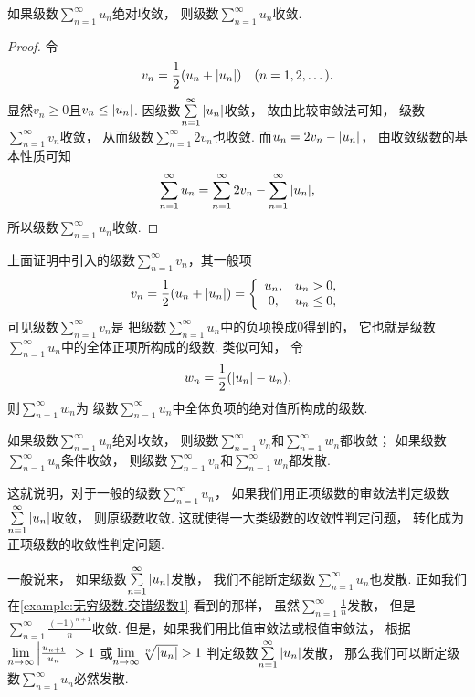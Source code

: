 \begin{theorem}\label{theorem:无穷级数.绝对收敛级数必定收敛}
如果级数\(\sum\limits_{n=1}^\infty u_n\)绝对收敛，
则级数\(\sum\limits_{n=1}^\infty u_n\)收敛.
\begin{proof}
令\[
	v_n = \frac{1}{2} (u_n + \abs{u_n})
	\quad(n=1,2,\dotsc).
\]
显然\(v_n \geq 0\)且\(v_n \leq \abs{u_n}\).
因级数\(\sum\limits_{n=1}^\infty \abs{u_n}\)收敛，
故由比较审敛法可知，
级数\(\sum\limits_{n=1}^\infty v_n\)收敛，
从而级数\(\sum\limits_{n=1}^\infty 2v_n\)也收敛.
而\(u_n = 2 v_n - \abs{u_n}\)，
由收敛级数的基本性质可知\[
	\sum\limits_{n=1}^\infty u_n
	= \sum\limits_{n=1}^\infty 2v_n
	- \sum\limits_{n=1}^\infty \abs{u_n},
\]
所以级数\(\sum\limits_{n=1}^\infty u_n\)收敛.
\end{proof}
\end{theorem}

上面证明中引入的级数\(\sum\limits_{n=1}^\infty v_n\)，其一般项\[
	v_n = \frac{1}{2} (u_n + \abs{u_n})
	= \left\{ \begin{array}{cl}
		u_n, & u_n > 0, \\
		0, & u_n \leq 0,
	\end{array} \right.
\]
可见级数\(\sum\limits_{n=1}^\infty v_n\)是
把级数\(\sum\limits_{n=1}^\infty u_n\)中的负项换成\(0\)得到的，
它也就是级数\(\sum\limits_{n=1}^\infty u_n\)中的全体正项所构成的级数.
类似可知，
令\[
	w_n = \frac{1}{2} (\abs{u_n} - u_n),
\]
则\(\sum\limits_{n=1}^\infty w_n\)为
级数\(\sum\limits_{n=1}^\infty u_n\)中全体负项的绝对值所构成的级数.

如果级数\(\sum\limits_{n=1}^\infty u_n\)绝对收敛，
则级数\(\sum\limits_{n=1}^\infty v_n\)和\(\sum\limits_{n=1}^\infty w_n\)都收敛；
如果级数\(\sum\limits_{n=1}^\infty u_n\)条件收敛，
则级数\(\sum\limits_{n=1}^\infty v_n\)和\(\sum\limits_{n=1}^\infty w_n\)都发散.

这就说明，对于一般的级数\(\sum\limits_{n=1}^\infty u_n\)，
如果我们用正项级数的审敛法判定级数
\(\sum\limits_{n=1}^\infty \abs{u_n}\)收敛，
则原级数收敛.
这就使得一大类级数的收敛性判定问题，
转化成为正项级数的收敛性判定问题.

一般说来，
如果级数\(\sum\limits_{n=1}^\infty \abs{u_n}\)发散，
我们不能断定级数\(\sum\limits_{n=1}^\infty u_n\)也发散.
正如我们在\cref{example:无穷级数.交错级数1} 看到的那样，
虽然\(\sum\limits_{n=1}^\infty \frac{1}{n}\)发散，
但是\(\sum\limits_{n=1}^\infty \frac{(-1)^{n+1}}{n}\)收敛.
但是，如果我们用比值审敛法或根值审敛法，
根据\(\lim\limits_{n\to\infty} \abs{\frac{u_{n+1}}{u_n}} > 1\)
或\(\lim\limits_{n\to\infty} \sqrt[n]{\abs{u_n}} > 1\)
判定级数\(\sum\limits_{n=1}^\infty \abs{u_n}\)发散，
那么我们可以断定级数\(\sum\limits_{n=1}^\infty u_n\)必然发散.

